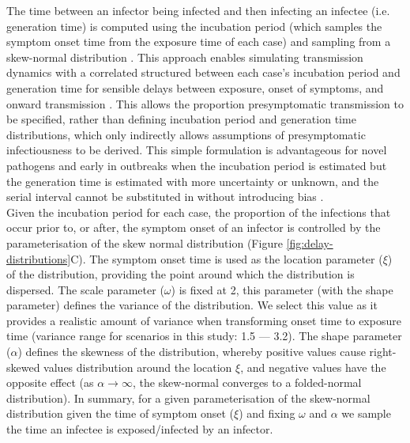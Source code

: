 \documentclass{article}
\begin{document}
The time between an infector being infected and then infecting an infectee (i.e. generation time) is computed using the incubation period (which samples the symptom onset time from the exposure time of each case) and sampling from a skew-normal distribution \citep{azzaliniClassDistributionsWhich1985}. This approach enables simulating transmission dynamics with a correlated structured between each case's incubation period and generation time for sensible delays between exposure, onset of symptoms, and onward transmission \citep{hellewellFeasibilityControllingCOVID192020}. This allows the proportion presymptomatic transmission to be specified, rather than defining incubation period and generation time distributions, which only indirectly allows assumptions of presymptomatic infectiousness to be derived. This simple formulation is advantageous for novel pathogens and early in outbreaks when the incubation period is estimated but the generation time is estimated with more uncertainty or unknown, and the serial interval cannot be substituted in without introducing bias \citep{brittonEstimationEmergingEpidemics2019a, lehtinenRelationshipSerialInterval2021}. \\

Given the incubation period for each case, the proportion of the infections that occur prior to, or after, the symptom onset of an infector is controlled by the parameterisation of the skew normal distribution (Figure \ref{fig:delay-distributions}C). The symptom onset time is used as the location parameter ($\xi$) of the distribution, providing the point around which the distribution is dispersed. The scale parameter ($\omega$) is fixed at 2, this parameter (with the shape parameter) defines the variance of the distribution. We select this value as it provides a realistic amount of variance when transforming onset time to exposure time (variance range for scenarios in this study: 1.5 --- 3.2). The shape parameter ($\alpha$) defines the skewness of the distribution, whereby positive values cause right-skewed values distribution around the location $\xi$, and negative values have the opposite effect (as $\alpha \rightarrow \infty$, the skew-normal converges to a folded-normal distribution). In summary, for a given parameterisation of the skew-normal distribution given the time of symptom onset ($\xi$) and fixing $\omega$ and $\alpha$ we sample the time an infectee is exposed/infected by an infector. \\
\end{document}
